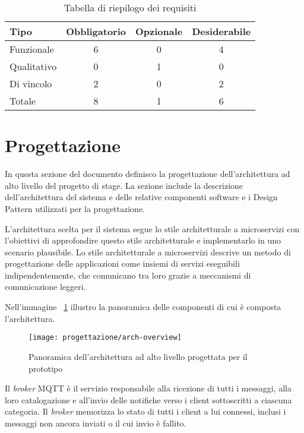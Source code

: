 \begin{table}[H]
\caption{Tabella di riepilogo dei requisiti}
\label{tab:requisiti-riepilogo}
\begin{tabularx}{\linewidth}{|X|c|c|c|}
\hline
\textbf{Tipo} & \textbf{Obbligatorio} & \textbf{Opzionale} & \textbf{Desiderabile} \\
\hline
Funzionale & 6 & 0 & 4 \\
\hline
Qualitativo & 0 & 1 & 0 \\
\hline
Di vincolo & 2 & 0 & 2 \\
\hline
Totale & 8 & 1 & 6 \\
\hline
\end{tabularx}
\end{table}

\pagebreak

\section{Progettazione}


In questa sezione del documento definisco la progettazione dell'architettura ad alto livello del progetto di stage.
La sezione include la descrizione dell'architettura del sistema e delle relative componenti software e i Design Pattern utilizzati per la progettazione.


L'architettura scelta per il sistema segue lo stile architetturale a microservizi con l'obiettivi di approfondire questo stile architetturale e implementarlo in uno scenario plausibile.
Lo stile architetturale a microservizi descrive un metodo di progettazione delle applicazioni come insiemi di servizi eseguibili indipendentemente, che comunicano tra loro grazie a meccanismi di comunicazione leggeri.

Nell'immagine ~\ref{img:overview-arch} illustro la panoramica delle componenti di cui è composta l'architettura.

\begin{figure}[H]
    \centering
    \texttt{[image: progettazione/arch-overview]}
    \caption{Panoramica dell'architettura ad alto livello progettata per il prototipo}
    \label{img:overview-arch}
\end{figure}


Il \emph{broker} MQTT è il servizio responsabile alla ricezione di tutti i messaggi, alla loro catalogazione e all'invio delle notifiche verso i client sottoscritti a ciascuna categoria.
Il \emph{broker} memorizza lo stato di tutti i client a lui connessi, inclusi i messaggi non ancora inviati o il cui invio è fallito.

